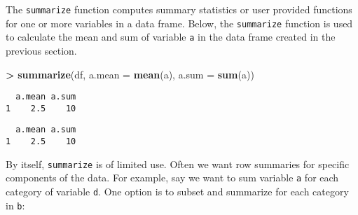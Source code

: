 \documentclass[]{krantz}
\makeatletter
\newenvironment{Shaded}{\begin{snugshade}}{\end{snugshade}}
\newcommand{\KeywordTok}[1]{\textcolor[rgb]{0.27,0.27,0.27}{\textbf{#1}}}
\newcommand{\DataTypeTok}[1]{\textcolor[rgb]{0.27,0.27,0.27}{#1}}
\newcommand{\StringTok}[1]{\textcolor[rgb]{0.5,0.5,0.5}{#1}}
\newcommand{\OperatorTok}[1]{\textcolor[rgb]{0.43,0.43,0.43}{\textbf{#1}}}
\newcommand{\ErrorTok}[1]{\textcolor[rgb]{0.14,0.14,0.14}{\textbf{#1}}}
\newcommand{\NormalTok}[1]{#1}
\newenvironment{kframe}{%
\medskip{}
\setlength{\fboxsep}{.8em}
 \def\at@end@of@kframe{}%
 \ifinner\ifhmode%
  \def\at@end@of@kframe{\end{minipage}}%
  \begin{minipage}{\columnwidth}%
 \fi\fi%
 \def\FrameCommand##1{\hskip\@totalleftmargin \hskip-\fboxsep
 \colorbox{shadecolor}{##1}\hskip-\fboxsep
     \hskip-\linewidth \hskip-\@totalleftmargin \hskip\columnwidth}%
 \MakeFramed {\advance\hsize-\width
   \@totalleftmargin\z@ \linewidth\hsize
   \@setminipage}}%
 {\par\unskip\endMakeFramed%
 \at@end@of@kframe}
\renewenvironment{Shaded}{\begin{kframe}}{\end{kframe}}
\theoremstyle{definition}
\theoremstyle{definition}
\theoremstyle{definition}
\theoremstyle{remark}
\makeatother
\begin{document}
The \texttt{summarize} function computes summary statistics or user
provided functions for one or more variables in a data frame. Below, the
\texttt{summarize} function is used to calculate the mean and sum of
variable \texttt{a} in the data frame created in the previous section.

\begin{Shaded}
\begin{Highlighting}[]
\OperatorTok{>}\StringTok{ }\KeywordTok{summarize}\NormalTok{(df, }\DataTypeTok{a.mean =} \KeywordTok{mean}\NormalTok{(a), }\DataTypeTok{a.sum =} \KeywordTok{sum}\NormalTok{(a))}
\end{Highlighting}
\end{Shaded}

\begin{verbatim}
  a.mean a.sum
1    2.5    10
\end{verbatim}

\begin{Shaded}
\end{Shaded}

\begin{verbatim}
  a.mean a.sum
1    2.5    10
\end{verbatim}

By itself, \texttt{summarize} is of limited use. Often we want row
summaries for specific components of the data. For example, say we want
to sum variable \texttt{a} for each category of variable \texttt{d}. One
option is to subset and summarize for each category in \texttt{b}:

\begin{Shaded}
\end{Shaded}
\end{document}
